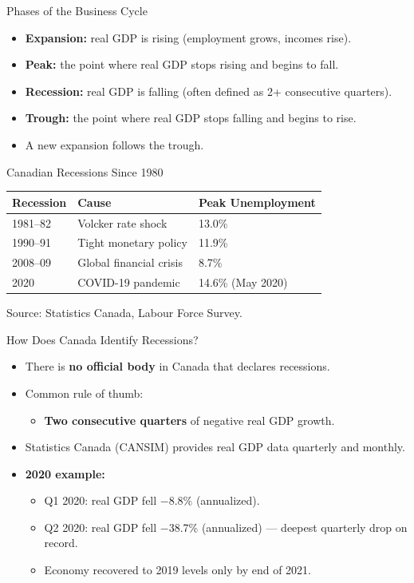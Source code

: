 \documentclass[aspectratio=169]{beamer}
\begin{document}
\begin{frame}{Phases of the Business Cycle}
\transfade
\begin{itemize}[<+->]
  \item \textbf{Expansion:} real GDP is rising (employment grows, incomes rise).
  \item \textbf{Peak:} the point where real GDP stops rising and begins to fall.
  \item \textbf{Recession:} real GDP is falling (often defined as 2+ consecutive quarters).
  \item \textbf{Trough:} the point where real GDP stops falling and begins to rise.
  \item A new expansion follows the trough.
\end{itemize}
\vspace{0.3em}
\begin{block}{Canadian Recessions Since 1980}
\small
\begin{tabular}{lll}
\toprule
\textbf{Recession} & \textbf{Cause} & \textbf{Peak Unemployment} \\
\midrule
1981--82 & Volcker rate shock & 13.0\% \\
1990--91 & Tight monetary policy & 11.9\% \\
2008--09 & Global financial crisis & 8.7\% \\
2020 & COVID-19 pandemic & \alert{14.6\%} (May 2020) \\
\bottomrule
\end{tabular}
\end{block}
{\tiny Source: Statistics Canada, Labour Force Survey.}
\end{frame}

\begin{frame}{How Does Canada Identify Recessions?}
\transfade
\begin{itemize}[<+->]
  \item There is \textbf{no official body} in Canada that declares recessions.
  \item Common rule of thumb:
  \begin{itemize}[<+->]
    \item \textbf{Two consecutive quarters} of negative real GDP growth.
  \end{itemize}
  \item Statistics Canada (CANSIM) provides real GDP data quarterly and monthly.
  \item \textbf{2020 example:}
  \begin{itemize}[<+->]
    \item Q1 2020: real GDP fell $-$8.8\% (annualized).
    \item Q2 2020: real GDP fell $-$38.7\% (annualized) --- deepest quarterly drop on record.
    \item Economy recovered to 2019 levels only by end of 2021.
  \end{itemize}
\end{itemize}
\end{frame}
\end{document}
